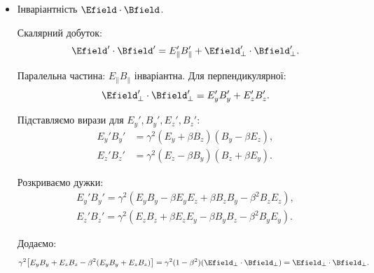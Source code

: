 \begin{problem}
\begin{itemize}
Різниця:
\begin{equation*}
    E_\perp'^2 - B_\perp'^2 = \gamma^2 \bigl[ E_\perp^2 + 2\beta X + \beta^2 B_\perp^2 - B_\perp^2 - 2\beta X - \beta^2 E_\perp^2 \bigr],
\end{equation*}
де \(X = E_y B_z - E_z B_y\). Члени з \(X\) скорочуються, тому
\begin{equation*}
    E_\perp'^2 - B_\perp'^2 = \gamma^2 (1 - \beta^2)(E_\perp^2 - B_\perp^2) = E_\perp^2 - B_\perp^2.
\end{equation*}

Додаючи паралельну частину, отримуємо
\begin{equation*}
    \Efield'^2 - \Bfield'^2 = \Efield^2 - \Bfield^2.
\end{equation*}

\item Інваріантність $\Efield \cdot \Bfield$.

Скалярний добуток:
\begin{equation*}
    \Efield' \cdot \Bfield' = E_\parallel' B_\parallel' + \Efield_\perp' \cdot \Bfield_\perp'.
\end{equation*}

Паралельна частина: \(E_\parallel B_\parallel\) інваріантна. Для перпендикулярної:
\begin{equation*}
    \Efield_\perp' \cdot \Bfield_\perp' = E_y' B_y' + E_z' B_z'.
\end{equation*}

Підставляємо вирази для \(E_y', B_y', E_z', B_z'\):
\begin{equation*}
    \begin{aligned}
    E_y' B_y' &= \gamma^2 (E_y + \beta B_z)(B_y - \beta E_z), \\
    E_z' B_z' &= \gamma^2 (E_z - \beta B_y)(B_z + \beta E_y).
    \end{aligned}
\end{equation*}

Розкриваємо дужки:
\begin{equation*}
\begin{aligned}
    E_y' B_y' = \gamma^2 \left( E_y B_y - \beta E_y E_z + \beta B_z B_y - \beta^2 B_z E_z \right), \\
    E_z' B_z' = \gamma^2 \left( E_z B_z + \beta E_z E_y - \beta B_y B_z - \beta^2 B_y E_y \right).
\end{aligned}
\end{equation*}

Додаємо:
\begin{equation*}
    \gamma^2 \bigl[ E_y B_y + E_z B_z - \beta^2 (E_y B_y + E_z B_z) \bigr] = \gamma^2 (1 - \beta^2) (\Efield_\perp \cdot \Bfield_\perp) = \Efield_\perp \cdot \Bfield_\perp.
\end{equation*}


\end{itemize}
\end{problem}
